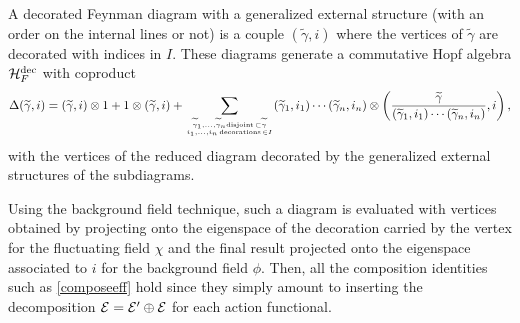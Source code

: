 \documentclass[10pt,here,feynmf]{article}
\begin{document}
A decorated Feynman diagram with a generalized external structure (with an order on the internal lines or not) is a couple $(\widetilde{\gamma},i)$ where the vertices of $\widetilde{\gamma}$ are decorated with indices in $I$. These diagrams generate a commutative Hopf algebra ${\cal H}_{F}^{\mathrm{dec}}$ with coproduct  
\begin{equation}
\Delta(\widetilde{\gamma},i)=(\widetilde{\gamma},i)\otimes 1+1\otimes(\widetilde{\gamma},i)+
\mathop{\sum}\limits_{\widetilde{\gamma}_{1},\dots,\widetilde{\gamma}_{n}
{\mathrm{disjoint}\,\subset\widetilde{\gamma}}
\atop
i_{1},\dots,i_{n} \,\mathrm{decorations}\,\in I}
(\widetilde{\gamma}_{1},i_{1})\cdots(\widetilde{\gamma}_{n},i_{n})
\otimes\left(\frac{\widetilde{\gamma}}{(\widetilde{\gamma}_{1},i_{1})\cdots(\widetilde{\gamma}_{n},i_{n})},i\right),
\end{equation}
with the vertices of the reduced diagram decorated by the generalized external structures of the subdiagrams. 

Using the background field technique, such a diagram is evaluated with vertices obtained by projecting onto the eigenspace of the decoration carried by the vertex for the fluctuating field $\chi$ and the final result projected onto the eigenspace associated to $i$ for the background field $\phi$. Then, all the composition identities such as \eqref{composeeff} hold since they simply amount to inserting the decomposition ${\cal E}={\cal E'}\oplus{\cal E}$ for each action functional. 
\end{document}
